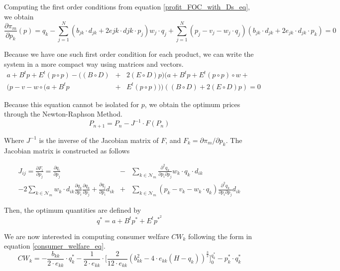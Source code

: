 \documentclass[12pt]{article}
\begin{document}
Computing the first order conditions from equation \ref{profit_FOC_with_Ds_eq}, we obtain
\begin{equation*}
\frac{\partial \pi_m}{\partial p_k}(p) = q_k - \sum_{j = 1}^N (b_{jk} \cdot d_{jk} + 2e{jk} \cdot d{jk} \cdot p_j) w_j \cdot q_j + \sum_{j = 1}^N (p_j - v_j - w_j \cdot q_j)(b_{jk} \cdot d_{jk} + 2e_{jk} \cdot d_{jk} \cdot p_k) = 0
\end{equation*}

Because we have one such first order condition for each product, we can write the system in a more compact way using matrices and vectors. 
\begin{eqnarray*}
a + B^t p + E^t (p \circ p) - ((B \circ D) &+& 2(E \circ D)p) (a + B^t p + E^t (p \circ p) \circ w + \\
(p - v - w\circ(a + B^t p &+& E^t (p \circ p)))((B \circ D) + 2 (E \circ D) p) = 0
\end{eqnarray*}

Because this equation cannot be isolated for $p$, we obtain the optimum prices through the Newton-Raphson Method.
\begin{equation*}
P_{n+1} = P_n - J^{-1} \cdot F(P_n)
\end{equation*}

Where $J^{-1}$ is the inverse of the Jacobian matrix of $F$, and $F_k = \partial \pi_m / \partial p_k$. The Jacobian matrix is constructed as follows

\begin{eqnarray*}
J_{ij} = \frac{\partial F_i}{\partial p_j} = \frac{\partial q_i}{\partial p_j} &-& \sum_{k \in \mathcal{N}_m} \frac{\partial^2 q_k}{\partial p_i \partial p_j} w_k \cdot q_k \cdot d_{ik}\\
 - 2\sum_{k \in \mathcal{N}_m} w_k \cdot d_{ik} \frac{\partial q_k}{\partial p_i} \frac{\partial q_k}{\partial p_j} + \frac{\partial q_j}{\partial p_i} d_{ik} &+& \sum_{k \in \mathcal{N}_m} (p_k - v_k - w_k \cdot q_k) \frac{\partial^2 q_k}{\partial p_i \partial p_j}d_{ik}
\end{eqnarray*}

Then, the optimum quantities are defined by 
\begin{equation*}
q^* = a + B^t p^* + E^t p^{*^2}
\end{equation*}

We are now interested in computing consumer welfare $CW_k$ following the form in equation \ref{consumer_welfare_eq}.
\begin{equation*}
CW_k = -\frac{b_{kk}}{2 \cdot e_{kk}} \cdot q_k^* -\frac{1}{2 \cdot e_{kk}} \cdot \bigg[\frac{2}{12 \cdot e_{kk}} (b_{kk}^2 - 4 \cdot e_{kk}(H - q_k))^{\frac{3}{2}}\bigg]_0^{q_k^*} - p_k^* \cdot q_k^*
\end{equation*}
\end{document}
